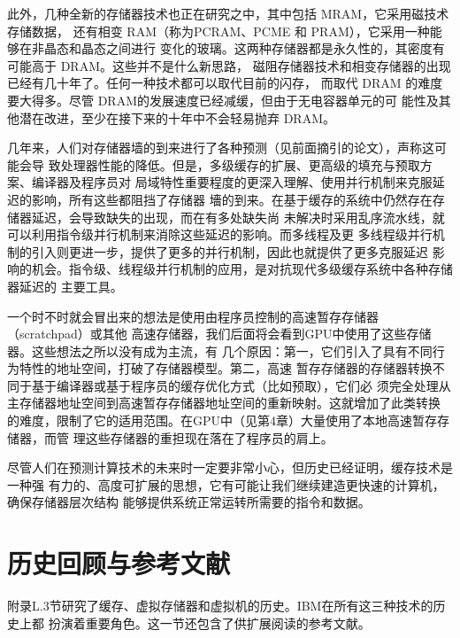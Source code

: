 此外，几种全新的存储器技术也正在研究之中，其中包括 MRAM，它采用磁技术存储数据，
还有相变 RAM（称为PCRAM、PCME 和 PRAM），它采用一种能够在非晶态和晶态之间进行
变化的玻璃。这两种存储器都是永久性的，其密度有可能高于 DRAM。这些并不是什么新思路，
磁阻存储器技术和相变存储器的出现已经有几十年了。任何一种技术都可以取代目前的闪存，
而取代 DRAM 的难度要大得多。尽管 DRAM的发展速度已经减缓，但由于无电容器单元的可
能性及其他潜在改进，至少在接下来的十年中不会轻易抛弃 DRAM。

几年来，人们对存储器墙的到来进行了各种预测（见前面摘引的论文），声称这可能会导
致处理器性能的降低。但是，多级缓存的扩展、更高级的填充与预取方案、编译器及程序员对
局域特性重要程度的更深入理解、使用并行机制来克服延迟的影响，所有这些都阻挡了存储器
墻的到来。在基于缓存的系统中仍然存在存储器延迟，会导致缺失的出现，而在有多处缺失尚
未解决时采用乱序流水线，就可以利用指令级并行机制来消除这些延迟的影响。而多线程及更
多线程级并行机制的引入则更进一步，提供了更多的并行机制，因此也就提供了更多克服延迟
影响的机会。指令级、线程级并行机制的应用，是对抗现代多级缓存系统中各种存储器延迟的
主要工具。

一个时不时就会冒出来的想法是使用由程序员控制的高速暂存存储器（scratchpad）或其他
高速存储器，我们后面将会看到GPU中使用了这些存储器。这些想法之所以没有成为主流，有
几个原因：第一，它们引入了具有不同行为特性的地址空间，打破了存储器模型。第二，高速
暂存存储器的存储器转换不同于基于编译器或基于程序员的缓存优化方式（比如预取），它们必
须完全处理从主存储器地址空间到高速暂存存储器地址空间的重新映射。这就增加了此类转换
的难度，限制了它的适用范围。在GPU中（见第4章）大量使用了本地高速暂存存储器，而管
理这些存储器的重担现在落在了程序员的肩上。

尽管人们在预测计算技术的未来时一定要非常小心，但历史已经证明，缓存技术是一种强
有力的、高度可扩展的思想，它有可能让我们继续建造更快速的计算机，确保存储器层次结构
能够提供系统正常运转所需要的指令和数据。

\section{历史回顾与参考文献}
附录L.3节研究了缓存、虚拟存储器和虚拟机的历史。IBM在所有这三种技术的历史上都
扮演着重要角色。这一节还包含了供扩展阅读的参考文献。

